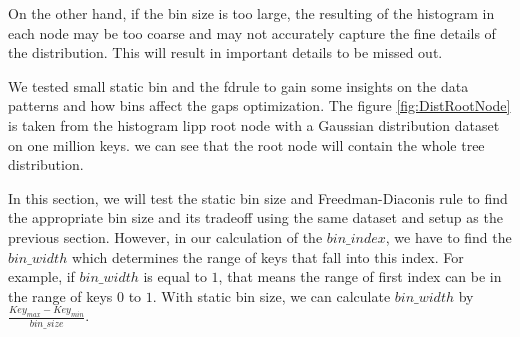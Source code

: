 On the other hand, if the bin size is too large, the resulting of the histogram in each node may be too coarse and may not accurately capture the fine details of the distribution. This will result in important details to be missed out. 

We tested small static bin and the \acrshort{fdrule} to gain some insights on the data patterns and how bins affect the gaps optimization. The figure \ref{fig:DistRootNode} is taken from the histogram \acrshort{lipp} root node with a Gaussian distribution dataset on one million keys. we can see that the root node will contain the whole tree distribution. 

In this section, we will test the static bin size and Freedman-Diaconis rule to find the appropriate bin size and its tradeoff using the same dataset and setup as the previous section. However, in our calculation of the $bin\_index$, we have to find the $bin\_width$ which determines the range of keys that fall into this index. For example, if $bin\_width$ is equal to $1$,  that means the range of first index can be in the range of keys $0$ to $1$. With static bin size, we can calculate $bin\_width$ by $\frac{Key_{max} - Key_{min}}{bin\_size}$.

